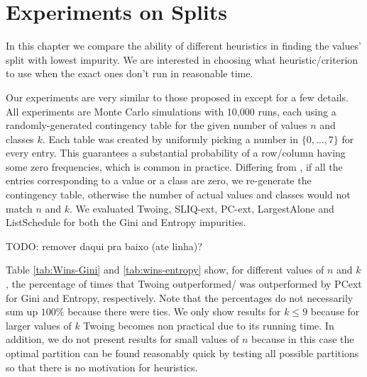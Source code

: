 \newpage

\chapter{Experiments on Splits}
\label{chap:experimentssplits}

In this chapter we compare the ability of different heuristics in finding the values' split with lowest impurity. We are interested in choosing what heuristic/criterion to use when the exact ones don't run in reasonable time.

Our experiments are very similar to those proposed in \cite{journals/datamine/CoppersmithHH99}
except for a few details. All experiments are Monte Carlo simulations with 10,000 runs, each using a randomly-generated contingency table for the given number of values $n$ and classes $k$. Each table  was created by uniformly picking a number in $\{0, \ldots, 7\}$ for every entry. This guarantees a substantial probability of a row/column having some zero frequencies, which is common in practice. Differing from  \cite{journals/datamine/CoppersmithHH99}, if all the entries corresponding to a value or a class are zero, we re-generate the contingency table, otherwise the number of actual values and classes would not match $n$ and $k$. We evaluated Twoing, SLIQ-ext, PC-ext, LargestAlone and ListSchedule for both the Gini and Entropy impurities.



TODO: remover daqui pra baixo (ate linha)?

Table \ref{tab:Wins-Gini} and \ref{tab:wins-entropy} show, for different values of $n$ and $k$, the percentage of times that
Twoing outperformed/ was outperformed by PCext for Gini and Entropy, respectively.
Note that the percentages do not necessarily sum up $100\%$ because
there were ties.
We only show results for $k \leq 9$ because for larger values
of $k$ Twoing becomes non practical due to its running time. In addition,
we do not present results for small values of $n$ because in this
case the optimal  partition can be found reasonably quick by testing all possible partitions
so that there is no motivation for heuristics.

